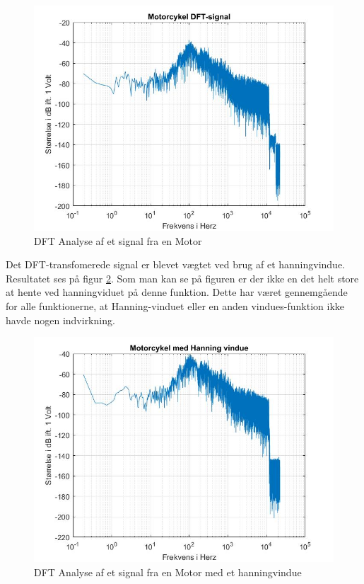 \begin{figure}[H]
	\centering
	\includegraphics[width=140mm]{figures/Motor/DFT.jpg}
	\caption{DFT Analyse af et signal fra en Motor}
	\label{fig:Motor DFT}
\end{figure}

Det DFT-transfomerede signal er blevet vægtet ved brug af et hanningvindue. Resultatet ses på figur \ref{fig:Motor hanning}. Som man kan se på figuren er der ikke en det helt store at hente ved hanningviduet på denne funktion. Dette har været gennemgående for alle funktionerne, at Hanning-vinduet eller en anden vindues-funktion ikke havde nogen indvirkning.
\begin{figure}[H]
	\centering
	\includegraphics[width=140mm]{figures/Motor/hanning.jpg}
	\caption{DFT Analyse af et signal fra en Motor med et hanningvindue}
	\label{fig:Motor hanning}
\end{figure}

